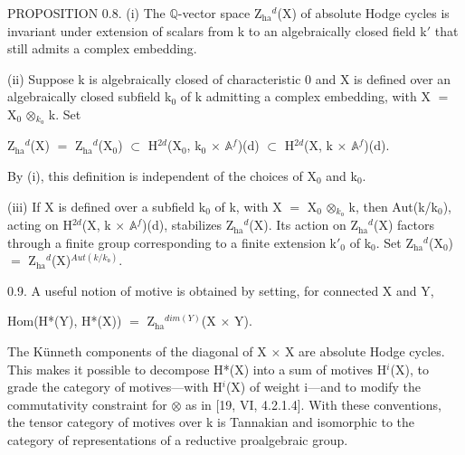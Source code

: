 \documentclass[10pt,twoside]{article}
\begin{document}
PROPOSITION 0.8. (i) The \ensuremath{ℚ}-vector space Z\ensuremath{_{\mathrm{ha}}}\ensuremath{^{d}}(X) of absolute Hodge cycles is invariant under extension of scalars from k to an algebraically closed field k\ensuremath{′} that still admits a complex embedding.\par
(ii) Suppose k is algebraically closed of characteristic 0 and X is defined over an algebraically closed subfield k\ensuremath{_{0}} of k admitting a complex embedding, with X \ensuremath{=} X\ensuremath{_{0}} \ensuremath{⊗}\ensuremath{_{k₀}} k. Set\par
Z\ensuremath{_{\mathrm{ha}}}\ensuremath{^{d}}(X) \ensuremath{=} Z\ensuremath{_{\mathrm{ha}}}\ensuremath{^{d}}(X\ensuremath{_{0}}) \ensuremath{⊂} H\ensuremath{^{2d}}(X\ensuremath{_{0}}, k\ensuremath{_{0}} \ensuremath{×} \ensuremath{𝔸}\ensuremath{^{f}})(d) \ensuremath{⊂} H\ensuremath{^{2d}}(X, k \ensuremath{×} \ensuremath{𝔸}\ensuremath{^{f}})(d).\par
By (i), this definition is independent of the choices of X\ensuremath{_{0}} and k\ensuremath{_{0}}.\par
(iii) If X is defined over a subfield k\ensuremath{_{0}} of k, with X \ensuremath{=} X\ensuremath{_{0}} \ensuremath{⊗}\ensuremath{_{k₀}} k, then Aut(k/k\ensuremath{_{0}}), acting on H\ensuremath{^{2d}}(X, k \ensuremath{×} \ensuremath{𝔸}\ensuremath{^{f}})(d), stabilizes Z\ensuremath{_{\mathrm{ha}}}\ensuremath{^{d}}(X). Its action on Z\ensuremath{_{\mathrm{ha}}}\ensuremath{^{d}}(X) factors through a finite group corresponding to a finite extension k\ensuremath{′}\ensuremath{_{0}} of k\ensuremath{_{0}}. Set Z\ensuremath{_{\mathrm{ha}}}\ensuremath{^{d}}(X\ensuremath{_{0}}) \ensuremath{=} Z\ensuremath{_{\mathrm{ha}}}\ensuremath{^{d}}(X)\ensuremath{^{Aut(k/k₀)}}.\par
0.9. A useful notion of motive is obtained by setting, for connected X and Y,\par
Hom(H*(Y), H*(X)) \ensuremath{=} Z\ensuremath{_{\mathrm{ha}}}\ensuremath{^{dim(Y)}}(X \ensuremath{×} Y).\par
The Künneth components of the diagonal of X \ensuremath{×} X are absolute Hodge cycles. This makes it possible to decompose H*(X) into a sum of motives H\ensuremath{^{i}}(X), to grade the category of motives—with H\ensuremath{^{i}}(X) of weight i—and to modify the commutativity constraint for \ensuremath{⊗} as in [19, VI, 4.2.1.4]. With these conventions, the tensor category of motives over k is Tannakian and isomorphic to the category of representations of a reductive proalgebraic group.\par
\end{document}
